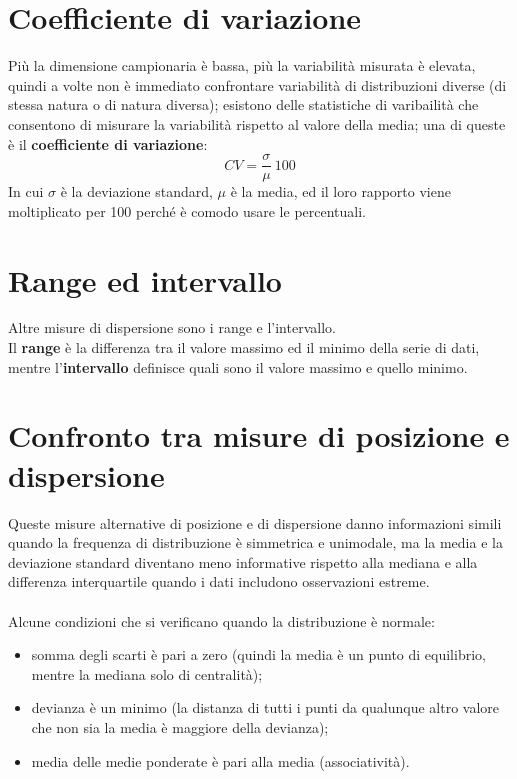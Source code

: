 \documentclass[10pt, draft]{book}
\begin{document}
\section{Coefficiente di variazione}
Più la dimensione campionaria è bassa, più la variabilità misurata è elevata, quindi a volte non è immediato confrontare variabilità di distribuzioni diverse (di stessa natura o di natura diversa); esistono delle statistiche di varibailità che consentono di misurare la variabilità rispetto al valore della media; una di queste è il \textbf{coefficiente di variazione}:
\begin{equation}
    CV = \frac{\sigma}{\mu}\ 100
\end{equation}
In cui $\sigma$ è la deviazione standard, $\mu$ è la media, ed il loro rapporto viene moltiplicato per 100 perché è comodo usare le percentuali.

\section{Range ed intervallo}
Altre misure di dispersione sono i range e l’intervallo.
\\
Il \textbf{range} è la differenza tra il valore massimo ed il minimo della serie di dati, mentre l’\textbf{intervallo} definisce quali sono il valore massimo e quello minimo.

\section{Confronto tra misure di posizione e dispersione}
Queste misure alternative di posizione e di dispersione danno informazioni simili quando la frequenza di distribuzione è simmetrica e unimodale, ma la media e la deviazione standard diventano meno informative rispetto alla mediana e alla differenza interquartile quando i dati includono osservazioni estreme.
\\
\\
Alcune condizioni che si verificano quando la distribuzione è normale:
\begin{itemize}
    \item somma degli scarti è pari a zero (quindi la media è un punto di equilibrio, mentre la mediana solo di centralità);
    \item devianza è un minimo (la distanza di tutti i punti da qualunque altro valore che non sia la media è maggiore della devianza);
    \item media delle medie ponderate è pari alla media (associatività).
\end{itemize}
\end{document}

